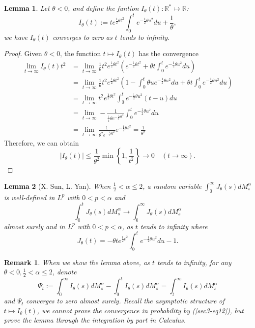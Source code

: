 \documentclass[11pt]{amsart}
\theoremstyle{plain}
\newtheorem{lemma}{Lemma}[section]
\newtheorem{remark}{Remark}
\numberwithin{equation}{section}
\begin{document}
\begin{lemma}
Let $\theta<0$, and define the funtion $I_\theta(t):\mathbb{R}^* \mapsto \mathbb{R}$:
$$
I_\theta(t):=te^{\frac{1}{2}\theta t^2}\int_0^t e^{-\frac{1}{2}\theta u^2}du+\frac{1}{\theta},
$$
we have $I_\theta(t)$ converges to zero as $t$ tends to infinity.
\end{lemma}

\begin{proof}
Given $\theta<0$, the function $t\mapsto I_\theta(t)$ has the convergence
\begin{equation}
\begin{aligned}
\lim_{t\rightarrow \infty}I_\theta(t)t^2 & = \lim_{t\rightarrow \infty}\frac{1}{\theta}t^2 e^{\frac{1}{2}\theta t^2}\left(e^{-\frac{1}{2}\theta t^2}+\theta t \int_0^t e^{-\frac{1}{2}\theta u^2}du\right)\\
&=\lim_{t\rightarrow \infty}\frac{1}{\theta}t^2 e^{\frac{1}{2}\theta t^2} \left(1-\int_0^t \theta ue^{-\frac{1}{2}\theta u^2}du+\theta  t \int_0^t e^{-\frac{1}{2}\theta u^2}du\right)\\
& = \lim_{t\rightarrow \infty} t^2 e^{\frac{1}{2}\theta t^2}\int_0^t e^{-\frac{1}{2}\theta u^2}(t-u)du\\
& =\lim_{t\rightarrow \infty}- \frac{1}{\frac{1}{t}\theta e^{-\frac{1}{2}\theta t^2}} \int_0^t e^{-\frac{1}{2}\theta u^2}du\\
& =\lim_{t\rightarrow \infty} \frac{1}{\theta^2 e^{-\frac{1}{2}\theta t^2}} e^{-\frac{1}{2}\theta t^2}=\frac{1}{\theta^2}
\end{aligned}
\end{equation}
Therefore, we can obtain
$$
|I_\theta(t)|\leq \frac{1}{\theta^2} \min\left\{1,\frac{1}{t^2}\right\}\longrightarrow0\quad(t\rightarrow\infty).
$$
\end{proof}

\begin{lemma}[X. Sun, L. Yan\cite{Yan2}]
When $\frac{1}{2}<\alpha \leq 2$, a random variable $\int_0^\infty J_\theta(s)dM_s^\alpha$ is well-defined in $L^p$ with $0<p<\alpha$ and 
\begin{equation}
\int_0^t J_\theta(s)dM_s^\alpha\longrightarrow \int_0^\infty J_\theta(s)dM_s^\alpha
\end{equation}
almost surely and in $L^p$ with $0<p<\alpha$, as $t$ tends to infinity where 
$$
J_\theta(t)=-\theta te^{\frac{1}{2}t^2}\int_0^t e^{-\frac{1}{2}\theta u^2}du-1.
$$
\end{lemma}

\begin{remark}
When we show the lemma above, as $t$ tends to infinity, for any $\theta<0,\frac{1}{2}<\alpha\leq 2$, denote
$$
\Psi_t:=\int_0^\infty I_\theta(s)dM_s^\alpha-\int_0^t I_\theta(s)dM_s^\alpha =\int_t^\infty I_\theta(s)dM_s^\alpha
$$
and $\Psi_t$ converges to zero almost surely. Recall the asymptotic structure of $t\mapsto I_\theta(t)$, we cannot prove the convergence in probability by (\ref{sec3-eq12}), but prove the lemma through the integration by part in Calculus.
\end{remark}
\end{document}
